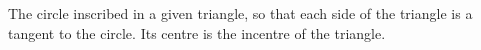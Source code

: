 The circle inscribed in a given triangle, so that each side of the triangle is a tangent to the circle. Its centre is the incentre
of the triangle.